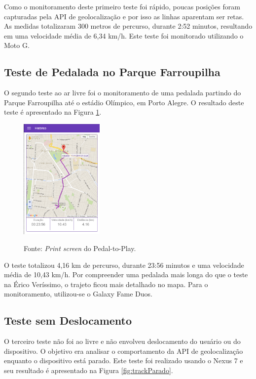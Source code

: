 Como o monitoramento deste primeiro teste foi rápido, poucas posições foram capturadas pela API de geolocalização e por isso as linhas aparentam ser retas. As medidas totalizaram 300 metros de percurso, durante 2:52 minutos, resultando em uma velocidade média de 6,34 km/h. Este teste foi monitorado utilizando o Moto G.

\subsection{Teste de Pedalada no Parque Farroupilha}
O segundo teste ao ar livre foi o monitoramento de uma pedalada partindo do Parque Farroupilha até o estádio Olímpico, em Porto Alegre. O resultado deste teste é apresentado na Figura \ref{fig:trackRedencao}.

\begin{figure}[h]
\begin{minipage}{1.0\textwidth}
    \centerline{\includegraphics[width=11em]{figuras/p2pTrackRedencao.png}}
    \label{fig:trackRedencao}
\end{minipage}
\centerline{Fonte: \textit{Print screen} do Pedal-to-Play.}
\end{figure}

O teste totalizou 4,16 km de percurso, durante 23:56 minutos e uma velocidade média de 10,43 km/h. Por compreender uma pedalada mais longa do que o teste na Érico Veríssimo, o trajeto ficou mais detalhado no mapa. Para o monitoramento, utilizou-se o Galaxy Fame Duos.

\subsection{Teste sem Deslocamento}
O terceiro teste não foi ao livre e não envolveu deslocamento do usuário ou do dispositivo. O objetivo era analisar o comportamento da API de geolocalização enquanto o dispositivo está parado. Este teste foi realizado usando o Nexus 7 e seu resultado é apresentado na Figura \ref{fig:trackParado}.

